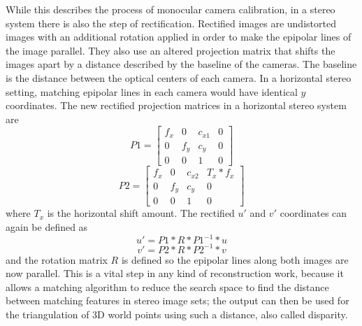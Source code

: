 While this describes the process of monocular camera calibration, in a stereo system there is also the step of rectification. Rectified images are undistorted images with an additional rotation applied in order to make the epipolar lines of the image parallel. They also use an altered projection matrix that shifts the images apart by a distance described by the baseline of the cameras. The baseline is the distance between the optical centers of each camera. In a horizontal stereo setting, matching epipolar lines in each camera would have identical $y$ coordinates. The new rectified projection matrices in a horizontal stereo system are
%
\begin{equation}
P1 =
\begin{bmatrix}
f_x & 0 & c_{x1} & 0\\ 0 & f_y & c_y & 0\\ 0 & 0 & 1 & 0
\end{bmatrix}
\end{equation}
\begin{equation}
P2 =
\begin{bmatrix}
f_x & 0 & c_{x2} & T_x * f_x\\ 0 & f_y & c_y & 0\\ 0 & 0 & 1 & 0
\end{bmatrix}
\end{equation}
%
where $T_x$ is the horizontal shift amount. The rectified $u'$ and $v'$ coordinates can again be defined as 
%
\begin{equation}
u'=P1*R*P1^{-1}*u
\end{equation}
\begin{equation}
v'=P2*R*P2^{-1}*v
\end{equation}
%
and the rotation matrix $R$ is defined so the epipolar lines along both images are now parallel. This is a vital step in any kind of reconstruction work, because it allows a matching algorithm to reduce the search space to find the distance between matching features in stereo image sets; the output can then be used for the triangulation of 3D world points using such a distance, also called disparity.